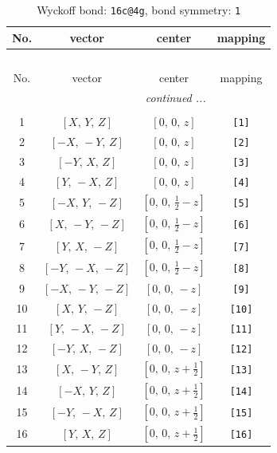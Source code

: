 \documentclass[fleqn,8pt]{jsarticle}
\begin{document}
\begin{longtable}{cccc}
\caption{Wyckoff bond: {\tt 16c@4g}, bond symmetry: {\tt 1}}
 \\
 \hline \hline
No. & vector & center & mapping \\ \hline \endfirsthead

\multicolumn{3}{l}{\tablename\ \thetable{}} \\
 \hline \hline
No. & vector & center & mapping \\ \hline \endhead

 \hline \hline
\multicolumn{3}{r}{\footnotesize\it continued ...} \\ \endfoot

 \hline \hline
\multicolumn{3}{r}{} \\ \endlastfoot

1 & $\left[ X,\, Y,\, Z \right]$ & $\left[ 0,\, 0,\, z \right]$ & {\tt [1]} \\ \hline
2 & $\left[ - X,\, - Y,\, Z \right]$ & $\left[ 0,\, 0,\, z \right]$ & {\tt [2]} \\ \hline
3 & $\left[ - Y,\, X,\, Z \right]$ & $\left[ 0,\, 0,\, z \right]$ & {\tt [3]} \\ \hline
4 & $\left[ Y,\, - X,\, Z \right]$ & $\left[ 0,\, 0,\, z \right]$ & {\tt [4]} \\ \hline
5 & $\left[ - X,\, Y,\, - Z \right]$ & $\left[ 0,\, 0,\, \frac{1}{2} - z \right]$ & {\tt [5]} \\ \hline
6 & $\left[ X,\, - Y,\, - Z \right]$ & $\left[ 0,\, 0,\, \frac{1}{2} - z \right]$ & {\tt [6]} \\ \hline
7 & $\left[ Y,\, X,\, - Z \right]$ & $\left[ 0,\, 0,\, \frac{1}{2} - z \right]$ & {\tt [7]} \\ \hline
8 & $\left[ - Y,\, - X,\, - Z \right]$ & $\left[ 0,\, 0,\, \frac{1}{2} - z \right]$ & {\tt [8]} \\ \hline
9 & $\left[ - X,\, - Y,\, - Z \right]$ & $\left[ 0,\, 0,\, - z \right]$ & {\tt [9]} \\ \hline
10 & $\left[ X,\, Y,\, - Z \right]$ & $\left[ 0,\, 0,\, - z \right]$ & {\tt [10]} \\ \hline
11 & $\left[ Y,\, - X,\, - Z \right]$ & $\left[ 0,\, 0,\, - z \right]$ & {\tt [11]} \\ \hline
12 & $\left[ - Y,\, X,\, - Z \right]$ & $\left[ 0,\, 0,\, - z \right]$ & {\tt [12]} \\ \hline
13 & $\left[ X,\, - Y,\, Z \right]$ & $\left[ 0,\, 0,\, z + \frac{1}{2} \right]$ & {\tt [13]} \\ \hline
14 & $\left[ - X,\, Y,\, Z \right]$ & $\left[ 0,\, 0,\, z + \frac{1}{2} \right]$ & {\tt [14]} \\ \hline
15 & $\left[ - Y,\, - X,\, Z \right]$ & $\left[ 0,\, 0,\, z + \frac{1}{2} \right]$ & {\tt [15]} \\ \hline
16 & $\left[ Y,\, X,\, Z \right]$ & $\left[ 0,\, 0,\, z + \frac{1}{2} \right]$ & {\tt [16]} \\
\end{longtable}
\end{document}
